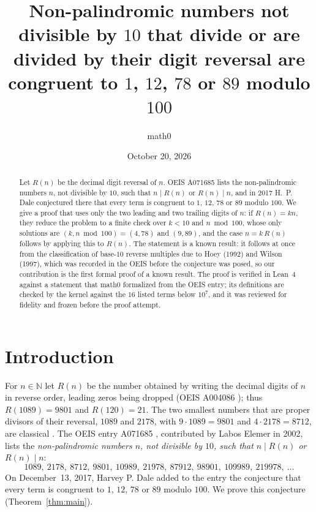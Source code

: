 \documentclass[11pt]{amsart}
\title[Reverse divisors modulo 100]{Non-palindromic numbers not divisible by $10$ that divide or are divided by their digit reversal are congruent to $1$, $12$, $78$ or $89$ modulo $100$}
\author{math0}
\date{October 20, 2026}
\theoremstyle{plain}
\theoremstyle{definition}
\newcommand{\N}{\mathbb{N}}
\begin{document}
\begin{abstract}
Let $R(n)$ be the decimal digit reversal of $n$. OEIS A071685 lists the non-palindromic numbers $n$, not divisible by $10$, such that $n\mid R(n)$ or $R(n)\mid n$, and in 2017 H.~P. Dale conjectured there that every term is congruent to $1$, $12$, $78$ or $89$ modulo $100$.
We give a proof that uses only the two leading and two trailing digits of $n$: if $R(n)=kn$, they reduce the problem to a finite check over $k<10$ and $n\bmod100$, whose only solutions are $(k,n\bmod100)=(4,78)$ and $(9,89)$, and the case $n=k\,R(n)$ follows by applying this to $R(n)$.
The statement is a known result: it follows at once from the classification of base-$10$ reverse multiples due to Hoey (1992) and Wilson (1997), which was recorded in the OEIS before the conjecture was posed, so our contribution is the first formal proof of a known result.
The proof is verified in Lean~4 against a statement that math0 formalized from the OEIS entry; its definitions are checked by the kernel against the $16$ listed terms below $10^7$, and it was reviewed for fidelity and frozen before the proof attempt.
\end{abstract}
\maketitle

\section{Introduction}

For $n\in\N$ let $R(n)$ be the number obtained by writing the decimal digits of $n$ in reverse order, leading zeros being dropped (OEIS A004086 \cite{A004086}); thus $R(1089)=9801$ and $R(120)=21$. The two smallest numbers that are proper divisors of their reversal, $1089$ and $2178$, with $9\cdot1089=9801$ and $4\cdot2178=8712$, are classical \cite{Sloane}. The OEIS entry A071685 \cite{A071685}, contributed by Labos Elemer in 2002, lists the \emph{non-palindromic numbers $n$, not divisible by $10$, such that $n\mid R(n)$ or $R(n)\mid n$}:
\[
  1089,\ 2178,\ 8712,\ 9801,\ 10989,\ 21978,\ 87912,\ 98901,\ 109989,\ 219978,\ \dots
\]
On December~13, 2017, Harvey P. Dale added to the entry the conjecture that every term is congruent to $1$, $12$, $78$ or $89$ modulo $100$. We prove this conjecture (Theorem~\ref{thm:main}).
\end{document}
